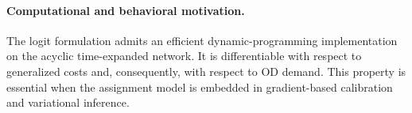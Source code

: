 \paragraph{Computational and behavioral motivation.}
The logit formulation admits an efficient dynamic-programming implementation on the acyclic time-expanded network.
It is differentiable with respect to generalized costs and, consequently, with respect to OD demand.
This property is essential when the assignment model is embedded in gradient-based calibration and variational inference.

